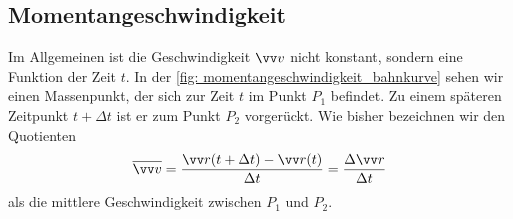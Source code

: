 \subsection{Momentangeschwindigkeit}\label{subsec: momentangeschwindigkeit}
Im Allgemeinen ist die Geschwindigkeit $\ivec{v}$ nicht konstant, sondern eine Funktion der Zeit $t$. In der \cref{fig: momentangeschwindigkeit_bahnkurve} sehen wir einen Massenpunkt, der sich zur Zeit $t$ im Punkt $P_1$ befindet. Zu einem späteren Zeitpunkt $t+\Delta t$ ist er zum Punkt $P_2$ vorgerückt. Wie bisher bezeichnen wir den Quotienten 
\begin{equation}\label{eq: quotient_durchschnittsgeschwindigkeit}
    \overline{\ivec{v}} = \frac{\ivec{r}(t+\Delta t) - \ivec{r}(t)}{\Delta t} = \frac{\Delta \ivec{r}}{\Delta t}
\end{equation}
als die mittlere Geschwindigkeit zwischen $P_1$ und $P_2$. 
